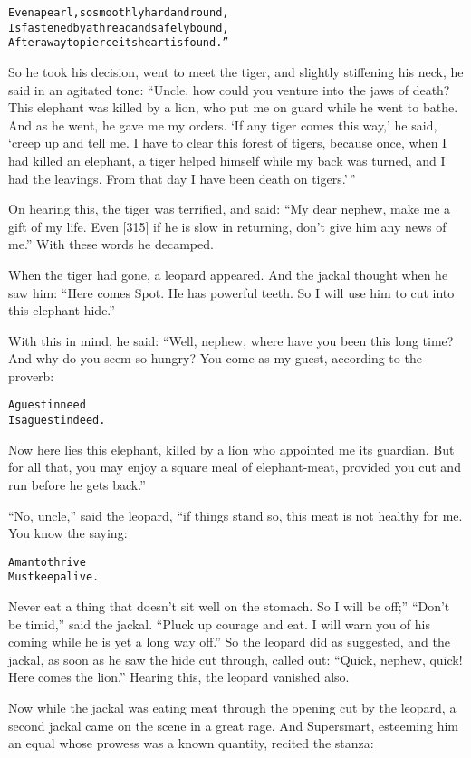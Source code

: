 \documentclass{article}
\renewenvironment{verbatim}{\begin{alltt}\normalfont\begin{centering}}{\end{centering}\end{alltt}}
\begin{document}
\begin{verbatim}
Even a pearl, so smoothly hard and round,
Is fastened by a thread and safely bound,
After a way to pierce its heart is found.”
\end{verbatim}
So he took his decision, went to meet the tiger, and slightly
stiffening his neck, he said in an agitated tone:
``Uncle, how could you venture into the jaws of death? This elephant was killed by a lion, who put me on guard while he went to bathe. And as he went, he gave me my orders. `If any tiger comes this way,' he said, `creep up and tell me. I have to clear this forest of tigers, because once, when I had killed an elephant, a tiger helped himself while my back was turned, and I had the leavings. From that day I have been death on tigers.'\,''

On hearing this, the tiger was terrified, and said:
``My dear nephew, make me a gift of my life. Even [315] if he is slow in returning, don't give him any news of me.''
With these words he decamped.

When the tiger had gone, a leopard appeared. And the jackal thought
when he saw him:
``Here comes Spot. He has powerful teeth. So I will use him to cut into this elephant-hide.''

With this in mind, he said: “Well, nephew, where have you been this
long time? And why do you seem so hungry? You come as my guest,
according to the proverb:

\begin{verbatim}
A guest in need
Is a guest indeed.
\end{verbatim}
Now here lies this elephant, killed by a lion who appointed me its
guardian. But for all that, you may enjoy a square meal of
elephant-meat, provided you cut and run before he gets back.”

``No, uncle,'' said the leopard, “if things stand so, this meat is
not healthy for me. You know the saying:

\begin{verbatim}
A man to thrive
Must keep alive.
\end{verbatim}
Never eat a thing that doesn't sit well on the stomach. So I will
be off;” ``Don't be timid,'' said the jackal.
``Pluck up courage and eat. I will warn you of his coming while he is yet a long way off.''
So the leopard did as suggested, and the jackal, as soon as he saw
the hide cut through, called out:
``Quick, nephew, quick! Here comes the lion.'' Hearing this, the
leopard vanished also.

Now while the jackal was eating meat through the opening cut by the
leopard, a second jackal came on the scene in a great rage. And
Supersmart, esteeming him an equal whose prowess was a known
quantity, recited the stanza:
\end{document}
